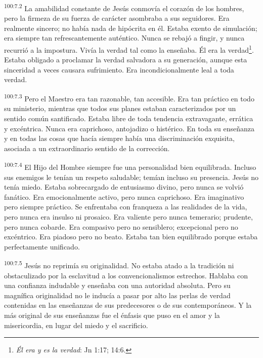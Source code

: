 \par
\textsuperscript{100:7.2} La amabilidad constante de Jesús conmovía el corazón de los hombres, pero la firmeza de su fuerza de carácter asombraba a sus seguidores. Era realmente sincero; no había nada de hipócrita en él. Estaba exento de simulación; era siempre tan refrescantemente auténtico. Nunca se rebajó a fingir, y nunca recurrió a la impostura. Vivía la verdad tal como la enseñaba. Él era la verdad\footnote{\textit{Él era y es la verdad}: Jn 1:17; 14:6.}. Estaba obligado a proclamar la verdad salvadora a su generación, aunque esta sinceridad a veces causara sufrimiento. Era incondicionalmente leal a toda verdad.

\par
\textsuperscript{100:7.3} Pero el Maestro era tan razonable, tan accesible. Era tan práctico en todo su ministerio, mientras que todos sus planes estaban caracterizados por un sentido común santificado. Estaba libre de toda tendencia extravagante, errática y excéntrica. Nunca era caprichoso, antojadizo o histérico. En toda su enseñanza y en todas las cosas que hacía siempre había una discriminación exquisita, asociada a un extraordinario sentido de la corrección.

\par
\textsuperscript{100:7.4} El Hijo del Hombre siempre fue una personalidad bien equilibrada. Incluso sus enemigos le tenían un respeto saludable; temían incluso su presencia. Jesús no tenía miedo. Estaba sobrecargado de entusiasmo divino, pero nunca se volvió fanático. Era emocionalmente activo, pero nunca caprichoso. Era imaginativo pero siempre práctico. Se enfrentaba con franqueza a las realidades de la vida, pero nunca era insulso ni prosaico. Era valiente pero nunca temerario; prudente, pero nunca cobarde. Era compasivo pero no sensiblero; excepcional pero no excéntrico. Era piadoso pero no beato. Estaba tan bien equilibrado porque estaba perfectamente unificado.

\par
\textsuperscript{100:7.5} Jesús no reprimía su originalidad. No estaba atado a la tradición ni obstaculizado por la esclavitud a los convencionalismos estrechos. Hablaba con una confianza indudable y enseñaba con una autoridad absoluta. Pero su magnífica originalidad no le inducía a pasar por alto las perlas de verdad contenidas en las enseñanzas de sus predecesores o de sus contemporáneos. Y la más original de sus enseñanzas fue el énfasis que puso en el amor y la misericordia, en lugar del miedo y el sacrificio.

